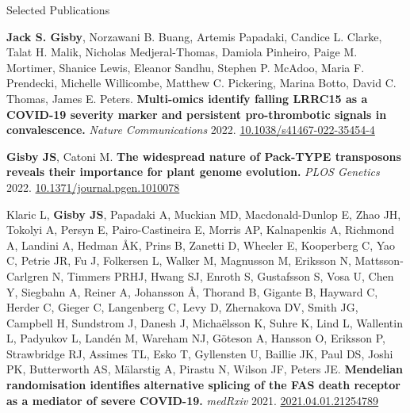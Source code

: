 \documentclass{resume}
\begin{document}
\begin{rSection}{Selected Publications}

\vspace{1pt plus 1pt}

\item \textbf{Jack S. Gisby}\textsuperscript{\textdagger}, Norzawani B. Buang\textsuperscript{\textdagger}, Artemis Papadaki, Candice L. Clarke, Talat H. Malik, Nicholas Medjeral-Thomas, Damiola Pinheiro, Paige M. Mortimer, Shanice Lewis, Eleanor Sandhu, Stephen P. McAdoo, Maria F. Prendecki, Michelle Willicombe, Matthew C. Pickering, Marina Botto, David C. Thomas\textsuperscript{\textdagger}, James E. Peters\textsuperscript{\textdagger}. \textbf{Multi-omics identify falling LRRC15 as a COVID-19 severity marker and persistent pro-thrombotic signals in convalescence.} \textit{Nature Communications} 2022. \href{https://doi.org/10.1038/s41467-022-35454-4}{10.1038/s41467-022-35454-4}

\vspace{4pt plus 1pt}

\item \textbf{Gisby JS}, Catoni M. \textbf{The widespread nature of Pack-TYPE transposons reveals their importance for plant genome evolution.} \textit{PLOS Genetics} 2022. \href{https://doi.org/10.1371/journal.pgen.1010078}{10.1371/journal.pgen.1010078}

\vspace{4pt plus 1pt}

\item Klaric L\textsuperscript{\textdagger}, \textbf{Gisby JS}\textsuperscript{\textdagger}, Papadaki A\textsuperscript{\textdagger}, Muckian MD, Macdonald-Dunlop E, Zhao JH, Tokolyi A, Persyn E, Pairo-Castineira E, Morris AP, Kalnapenkis A, Richmond A, Landini A, Hedman ÅK, Prins B, Zanetti D, Wheeler E, Kooperberg C, Yao C, Petrie JR, Fu J, Folkersen L, Walker M, Magnusson M, Eriksson N, Mattsson-Carlgren N, Timmers PRHJ, Hwang SJ, Enroth S, Gustafsson S, Vosa U, Chen Y, Siegbahn A, Reiner A, Johansson Å, Thorand B, Gigante B, Hayward C, Herder C, Gieger C, Langenberg C, Levy D, Zhernakova DV, Smith JG, Campbell H, Sundstrom J, Danesh J, Michaëlsson K, Suhre K, Lind L, Wallentin L, Padyukov L, Landén M, Wareham NJ, Göteson A, Hansson O, Eriksson P, Strawbridge RJ, Assimes TL, Esko T, Gyllensten U, Baillie JK, Paul DS, Joshi PK, Butterworth AS, Mälarstig A, Pirastu N, Wilson JF\textsuperscript{\textdagger}, Peters JE\textsuperscript{\textdagger}. \textbf{Mendelian randomisation identifies alternative splicing of the FAS death receptor as a mediator of severe COVID-19.} \textit{medRxiv} 2021. \href{https://doi.org/10.1101/2021.04.01.21254789 }{2021.04.01.21254789}


\end{rSection}
\end{document}
